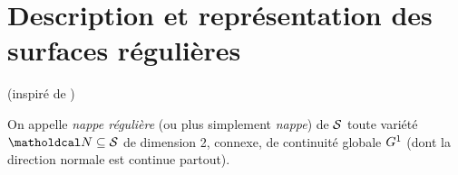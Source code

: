 \section{Description et représentation des surfaces régulières \piecewise}

\label{section:description_surface_G1_piecewise}
(inspiré de \cite{rossignac1985})

\begin{definition}
	On appelle \emph{nappe régulière} (ou plus simplement \emph{nappe}) de $\mathcal{S}$ toute variété $\nappe \subseteq \interface$ de dimension 2, connexe, de continuité globale $G^{1}$ (\ie dont la direction normale est continue partout).
\end{definition}

